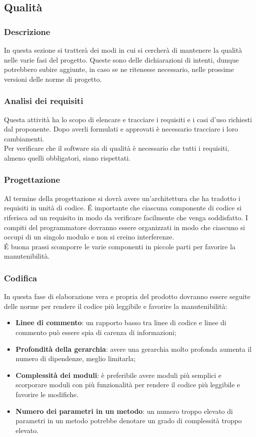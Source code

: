 \subsection{Qualità}
\subsubsection{Descrizione}
In questa sezione si tratterà dei modi in cui si cercherà di mantenere la qualità nelle varie fasi del progetto. Queste sono delle dichiarazioni di intenti, dunque potrebbero subire aggiunte, in caso se ne ritenesse necessario, nelle prossime versioni delle norme di  progetto.
\subsubsection{Analisi dei requisiti}
Questa attività ha lo scopo di elencare e tracciare i requisiti e i casi d'uso richiesti dal proponente. Dopo averli formulati e approvati è necessario tracciare i loro cambiamenti. \\
Per verificare che il software sia di qualità è necessario che tutti i requisiti, almeno quelli obbligatori, siano rispettati.
\subsubsection{Progettazione}
Al termine della progettazione si dovrà avere un'architettura che ha tradotto i requisiti in unità di codice. \'E importante che ciascuna componente di codice si riferisca ad un requisito in modo da verificare facilmente che venga soddisfatto. I compiti del programmatore dovranno essere organizzati in modo che ciascuno si occupi di un singolo modulo e non si creino interferenze.\\
\'E buona prassi scomporre le varie componenti in piccole parti per favorire la manutenibilità. 
\subsubsection{Codifica}
In questa fase di elaborazione vera e propria del prodotto dovranno essere seguite delle norme per rendere il codice più leggibile e favorire la manutenibilità:
\begin{itemize}
\item \textbf{Linee di commento}: un rapporto basso tra linee di codice e linee di commento può essere spia di carenza di informazioni;
\item \textbf{Profondità della gerarchia}: avere una gerarchia molto profonda aumenta il numero di dipendenze, meglio limitarla;
\item \textbf{Complessità dei moduli}: è preferibile avere moduli più semplici e scorporare moduli con più funzionalità per rendere il codice più leggibile e favorire le modifiche. 
\item \textbf{Numero dei parametri in un metodo}: un numero troppo elevato di parametri in un metodo potrebbe denotare un grado di complessità troppo elevato.
\end{itemize}